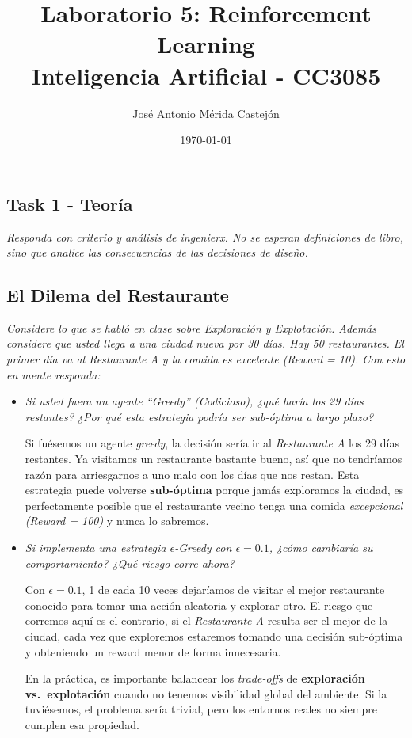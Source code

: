 \documentclass[11pt]{article}
\title{\textbf{Laboratorio 5: Reinforcement Learning} \vspace{1em}\\
Inteligencia Artificial - CC3085}
\author{José Antonio Mérida Castejón}
\date{\today}
\begin{document}
\maketitle

\subsection*{Task 1 - Teoría}
\textit{Responda con criterio y análisis de ingenierx. No se esperan definiciones de libro, sino que analice las
consecuencias de las decisiones de diseño.}

\subsection*{El Dilema del Restaurante}
\textit{Considere lo que se habló en clase sobre Exploración y Explotación. Además considere que usted llega a una
ciudad nueva por 30 días. Hay 50 restaurantes. El primer día va al Restaurante A y la comida es excelente
(Reward = 10). Con esto en mente responda:}

\begin{itemize}[leftmargin=*, itemsep=0.8em]

\item \textit{Si usted fuera un agente ``Greedy'' (Codicioso), ¿qué haría los 29 días restantes? ¿Por qué esta
    estrategia podría ser sub-óptima a largo plazo?}

    Si fuésemos un agente \textit{greedy}, la decisión sería ir al \textit{Restaurante A} los 29 días restantes.
    Ya visitamos un restaurante bastante bueno, así que no tendríamos razón para arriesgarnos a uno malo con los
    días que nos restan. Esta estrategia puede volverse \textbf{sub-óptima} porque jamás exploramos la ciudad,
    es perfectamente posible que el restaurante vecino tenga una comida \textit{excepcional (Reward = 100)} y
    nunca lo sabremos.

\item \textit{Si implementa una estrategia $\epsilon$-Greedy con $\epsilon = 0.1$, ¿cómo cambiaría su comportamiento?
    ¿Qué riesgo corre ahora?}

    Con $\epsilon = 0.1$, 1 de cada 10 veces dejaríamos de visitar el mejor restaurante conocido para tomar una
    acción aleatoria y explorar otro. El riesgo que corremos aquí es el contrario, si el \textit{Restaurante A}
    resulta ser el mejor de la ciudad, cada vez que exploremos estaremos tomando una decisión sub-óptima y
    obteniendo un reward menor de forma innecesaria.

    En la práctica, es importante balancear los \textit{trade-offs} de \textbf{exploración vs.\ explotación}
    cuando no tenemos visibilidad global del ambiente. Si la tuviésemos, el problema sería trivial, pero los
    entornos reales no siempre cumplen esa propiedad.

\end{itemize}
\end{document}
